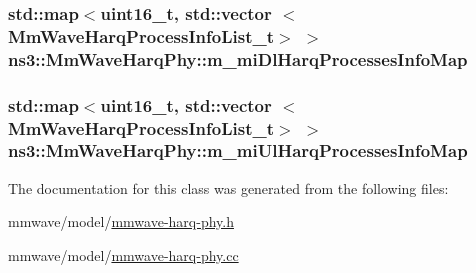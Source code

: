 \subsubsection[{\texorpdfstring{m\+\_\+mi\+Dl\+Harq\+Processes\+Info\+Map}{m_miDlHarqProcessesInfoMap}}]{\setlength{\rightskip}{0pt plus 5cm}std\+::map$<$uint16\+\_\+t, std\+::vector $<${\bf Mm\+Wave\+Harq\+Process\+Info\+List\+\_\+t}$>$ $>$ ns3\+::\+Mm\+Wave\+Harq\+Phy\+::m\+\_\+mi\+Dl\+Harq\+Processes\+Info\+Map\hspace{0.3cm}{\ttfamily [private]}}\hypertarget{classns3_1_1MmWaveHarqPhy_aed3643640d3493d9afd67293bb33a2d2}{}\label{classns3_1_1MmWaveHarqPhy_aed3643640d3493d9afd67293bb33a2d2}
\subsubsection[{\texorpdfstring{m\+\_\+mi\+Ul\+Harq\+Processes\+Info\+Map}{m_miUlHarqProcessesInfoMap}}]{\setlength{\rightskip}{0pt plus 5cm}std\+::map$<$uint16\+\_\+t, std\+::vector $<${\bf Mm\+Wave\+Harq\+Process\+Info\+List\+\_\+t}$>$ $>$ ns3\+::\+Mm\+Wave\+Harq\+Phy\+::m\+\_\+mi\+Ul\+Harq\+Processes\+Info\+Map\hspace{0.3cm}{\ttfamily [private]}}\hypertarget{classns3_1_1MmWaveHarqPhy_ab8f5ff765751b8ba84f4d0f4f7c1edc7}{}\label{classns3_1_1MmWaveHarqPhy_ab8f5ff765751b8ba84f4d0f4f7c1edc7}


The documentation for this class was generated from the following files\+:\begin{DoxyCompactItemize}
\item 
mmwave/model/\hyperlink{mmwave-harq-phy_8h}{mmwave-\/harq-\/phy.\+h}\item 
mmwave/model/\hyperlink{mmwave-harq-phy_8cc}{mmwave-\/harq-\/phy.\+cc}\end{DoxyCompactItemize}
